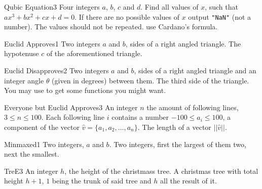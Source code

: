 \begin{task}{Qubic Equation}{3}
\In
Four integers $a$, $b$, $c$ and $d$.
\Out
Find all values of $x$, such that $ax^3 + bx^2 + cx + d = 0$. 
\Note
If there are no possible values of $x$ output \texttt{"NaN"} (not a number). 
The values should not be repeated.
\Hint
use Cardano's formula.
\end{task}

\begin{task}{Euclid Approves}{1}
\In
Two integers $a$ and $b$, sides of a right angled triangle.
\Out
The hypotenuse $c$ of the aforementioned triangle.

\begin{ExampleIO}
\end{ExampleIO}
\end{task}

\begin{task}{Euclid Disapproves}{2}
\In
Two integers $a$ and $b$, sides of a right angled triangle and an integer angle
$\theta$ (given in degrees) between them.
\Out
The third side of the triangle.
\Hint
You may use  to get some functions you might want.
\end{task}

\begin{task}{Everyone but Euclid Approves}{3}
\In
An integer $n$ the amount of following lines, $3 \leq n \leq 100$. 
Each following line $i$ contains a number $-100 \leq a_i \leq 100$, a 
component of the vector $\hat{v} = \{a_1, a_2, \dots, a_n\}$.
\Out
The length of a vector $||\hat{v}||$.
\end{task}

\begin{task}{Minmaxed}{1}
\In
Two integers, $a$ and $b$.
\Out
Two integers, first the largest of them two, next the smallest.
\end{task}

\begin{task}{TreE}{3}
\In
An integer $h$, the height of the christmass tree.
\Out
A christmas tree with total height $h + 1$, $1$ being the trunk of said
tree and $h$ all the result of it.

\begin{ExampleIO}
\end{ExampleIO}
\end{task}

